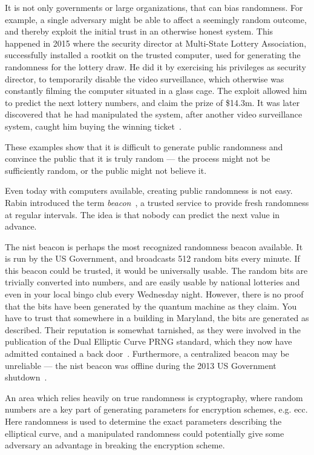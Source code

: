 It is not only governments or large organizations, that can bias randomness.
For example, a single adversary might be able to affect a seemingly random outcome, and thereby exploit the initial trust in an otherwise honest system.
This happened in 2015 where the security director at Multi-State Lottery Association, successfully installed a rootkit on the trusted computer, used for generating the randomness for the lottery draw.
He did it by exercising his privileges as security director, to temporarily disable the video surveillance, which otherwise was constantly filming the computer situated in a glass cage.
The exploit allowed him to predict the next lottery numbers, and claim the prize of \$14.3m.
It was later discovered that he had manipulated the system, after another video surveillance system, caught him buying the winning ticket~\cite{bbclotteryexploit}.

These examples show that it is difficult to generate public randomness and convince the public that it is truly random --- the process might not be sufficiently random, or the public might not believe it.

Even today with computers available, creating public randomness is not easy. Rabin introduced the term \emph{beacon}~\cite{rabin1983transaction}, a trusted service to provide fresh randomness at regular intervals. The idea is that nobody can predict the next value in advance.

The \gls{nist} beacon is perhaps the most recognized randomness beacon available.
It is run by the US Government, and broadcasts 512 random bits every minute.
If this beacon could be trusted, it would be universally usable. The random bits are trivially converted into numbers, and are easily usable by national lotteries and even in your local bingo club every Wednesday night.
However, there is no proof that the bits have been generated by the quantum machine as they claim. You have to trust that somewhere in a building in Maryland, the bits are generated as described.
Their reputation is somewhat tarnished, as they were involved in the publication of the Dual Elliptic Curve PRNG standard, which they now have admitted contained a back door~\cite{nist2014backdoor}.
Furthermore, a centralized beacon may be unreliable --- the \gls{nist} beacon was offline during the 2013 US Government shutdown~\cite{bonneau2015bitcoin}.

An area which relies heavily on true randomness is cryptography, where random numbers are a key part of generating parameters for encryption schemes, e.g. \gls{ecc}.
Here randomness is used to determine the exact parameters describing the elliptical curve, and a manipulated randomness could potentially give some adversary an advantage in breaking the encryption scheme.

